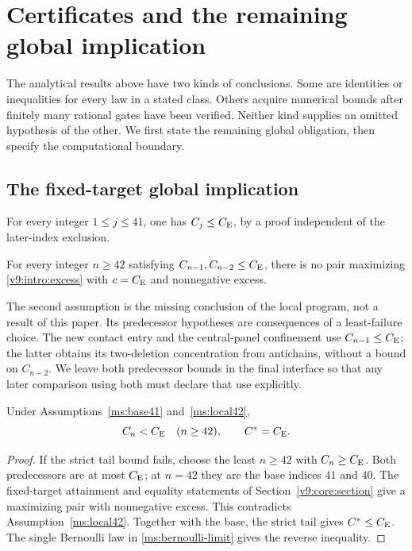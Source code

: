 \section{Certificates and the remaining global implication}\label{ms:certificates}

The analytical results above have two kinds of conclusions. Some are
identities or inequalities for every law in a stated class. Others acquire
numerical bounds after finitely many rational gates have been verified.
Neither kind supplies an omitted hypothesis of the other. We first state
the remaining global obligation, then specify the computational boundary.

\subsection{The fixed-target global implication}

\begin{assumption}\label{ms:base41}
For every integer $1\le j\le41$, one has $C_j\le C_{\mathrm E}$, by a proof
independent of the later-index exclusion.
\end{assumption}

\begin{assumption}\label{ms:local42}
For every integer $n\ge42$ satisfying
$C_{n-1},C_{n-2}\le C_{\mathrm E}$, there is no pair maximizing
\eqref{v9:intro:excess} with $c=C_{\mathrm E}$ and nonnegative excess.
\end{assumption}

The second assumption is the missing conclusion of the local program,
not a result of this paper. Its predecessor hypotheses are consequences
of a least-failure choice. The new contact entry and the central-panel
confinement use $C_{n-1}\le C_{\mathrm E}$; the latter obtains its two-deletion
concentration from antichains, without a bound on $C_{n-2}$.
We leave both predecessor bounds in the final interface so that any later
comparison using both must declare that use explicitly.

\begin{theorem}\label{ms:conditional-global}
Under Assumptions~\ref{ms:base41} and~\ref{ms:local42},
\[
 C_n<C_{\mathrm E}\quad(n\ge42),\qquad C^*=C_{\mathrm E}.
\]
\end{theorem}
\begin{proof}
If the strict tail bound fails, choose the least $n\ge42$ with
$C_n\ge C_{\mathrm E}$. Both predecessors are at most $C_{\mathrm E}$; at $n=42$ they
are the base indices $41$ and $40$. The fixed-target attainment and
equality statements of Section~\ref{v9:core:section} give a maximizing
pair with nonnegative excess. This contradicts
Assumption~\ref{ms:local42}. Together with the base, the strict tail gives
$C^*\le C_{\mathrm E}$. The single Bernoulli law in
\eqref{ms:bernoulli-limit} gives the reverse inequality.
\end{proof}

